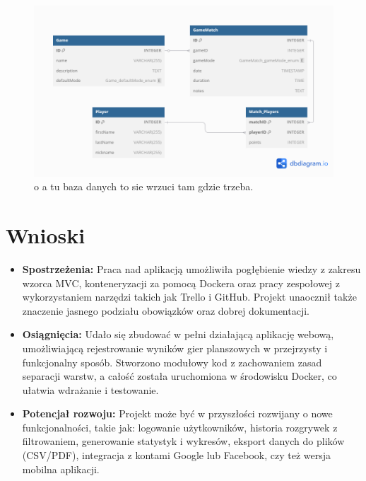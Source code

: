 \documentclass[12pt,a4paper]{article}
\begin{document}
\pagebreak
\begin{figure}
	\centering
	\includegraphics[width=1\linewidth]{media/baza_danych}
	\caption{o a tu baza danych to sie wrzuci tam gdzie trzeba.}
	\label{fig:bazadanych}
\end{figure}


\section{Wnioski}
\begin{itemize}
	\item \textbf{Spostrzeżenia:} Praca nad aplikacją umożliwiła pogłębienie wiedzy z zakresu wzorca MVC, konteneryzacji za pomocą Dockera oraz pracy zespołowej z wykorzystaniem narzędzi takich jak Trello i GitHub. Projekt unaocznił także znaczenie jasnego podziału obowiązków oraz dobrej dokumentacji.
	\item \textbf{Osiągnięcia:} Udało się zbudować w pełni działającą aplikację webową, umożliwiającą rejestrowanie wyników gier planszowych w przejrzysty i funkcjonalny sposób. Stworzono modułowy kod z zachowaniem zasad separacji warstw, a całość została uruchomiona w środowisku Docker, co ułatwia wdrażanie i testowanie.
	\item \textbf{Potencjał rozwoju:} Projekt może być w przyszłości rozwijany o nowe funkcjonalności, takie jak: logowanie użytkowników, historia rozgrywek z filtrowaniem, generowanie statystyk i wykresów, eksport danych do plików (CSV/PDF), integracja z kontami Google lub Facebook, czy też wersja mobilna aplikacji.
\end{itemize}
\end{document}
